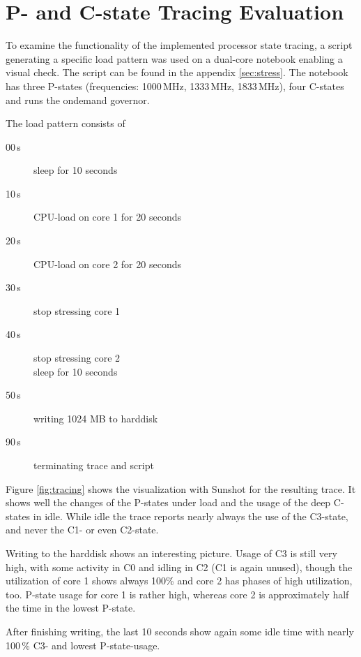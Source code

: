 
%
%
\newpage
\section{P- and C-state Tracing Evaluation}
To examine the functionality of the implemented processor state tracing, a script generating a specific load pattern was used on a dual-core notebook enabling a visual check. The script can be found in the appendix \ref{sec:stress}. The notebook has three P-states (frequencies: 1000\,MHz, 1333\,MHz, 1833\,MHz), four C-states and runs the ondemand governor.

The load pattern consists of

%
\begin{multicols}{2}
\begin{description}
\item[00\,s] sleep for 10 seconds
\item[10\,s] CPU-load on core 1 for 20 seconds
\item[20\,s] CPU-load on core 2 for 20 seconds
\item[30\,s] stop stressing core 1
\item[40\,s] stop stressing core 2\\sleep for 10 seconds
\item[50\,s] writing 1024 MB to harddisk
\item[90\,s] terminating trace and script
\end{description}
\end{multicols}
%

\noindent
Figure \ref{fig:tracing} shows the visualization with Sunshot for the resulting trace. It shows well the changes of the P-states under load and the usage of the deep C-states in idle. While idle the trace reports nearly always the use of the C3-state, and never the C1- or even C2-state.

Writing to the harddisk shows an interesting picture. Usage of C3 is still very high, with some activity in C0 and idling in C2 (C1 is again unused), though the utilization of core 1 shows always 100\% and core 2 has phases of high utilization, too. 
P-state usage for core 1 is rather high, whereas core 2 is approximately half the time in the lowest P-state.

After finishing writing, the last 10 seconds show again some idle time with nearly 100\,\% C3- and lowest P-state-usage.

